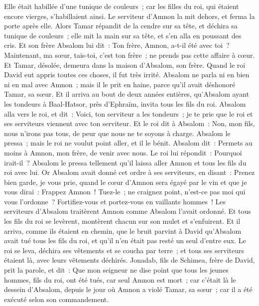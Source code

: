 \begin{multicols}{2}
Elle était habillée d'une tunique de couleurs~; car les filles du roi, qui étaient encore vierges, s'habillaient ainsi. Le serviteur d'Amnon la mit dehors, et ferma la porte après elle.
Alors Tamar répandit de la cendre sur sa tête, et déchira sa tunique de couleurs~; elle mit la main sur sa tête, et s'en alla en poussant des cris.
Et son frère Absalom lui dit~: Ton frère, Amnon, a-t-il été avec toi~? Maintenant, ma sœur, tais-toi, c'est ton frère~; ne prends pas cette affaire à cœur. Et Tamar, désolée, demeura dans la maison d'Absalom, son frère.
Quand le roi David eut appris toutes ces choses, il fut très irrité.
Absalom ne parla ni en bien ni en mal avec Amnon~; mais il le prit en haine, parce qu'il avait déshonoré Tamar, sa sœur.
Et il arriva au bout de deux années entières, qu'Absalom ayant les tondeurs à Baal-Hatsor, près d'Ephraïm, invita tous les fils du roi.
Absalom alla vers le roi, et dit~: Voici, ton serviteur a les tondeurs~; je te prie que le roi et ses serviteurs viennent avec ton serviteur.
Et le roi dit à Absalom~: Non, mon fils, nous n'irons pas tous, de peur que nous ne te soyons à charge. Absalom le pressa~; mais le roi ne voulut point aller, et il le bénit.
Absalom dit~: Permets au moins à Amnon, mon frère, de venir avec nous. Le roi lui répondit~: Pourquoi irait-il~?
Absalom le pressa tellement qu'il laissa aller Amnon et tous les fils du roi avec lui.
Or Absalom avait donné cet ordre à ses serviteurs, en disant~: Prenez bien garde, je vous prie, quand le cœur d'Amnon sera égayé par le vin et que je vous dirai~: Frappez Amnon~! Tuez-le~; ne craignez point, n'est-ce pas moi qui vous l'ordonne~? Fortifiez-vous et portez-vous en vaillants hommes~!
Les serviteurs d'Absalom traitèrent Amnon comme Absalom l'avait ordonné. Et tous les fils du roi se levèrent, montèrent chacun sur son mulet et s'enfuirent.
Et il arriva, comme ils étaient en chemin, que le bruit parvint à David qu'Absalom avait tué tous les fils du roi, et qu'il n'en était pas resté un seul d'entre eux.
Le roi se leva, déchira ses vêtements et se coucha par terre~; et tous ses serviteurs étaient là, avec leurs vêtements déchirés.
Jonadab, fils de Schimea, frère de David, prit la parole, et dit~: Que mon seigneur ne dise point que tous les jeunes hommes, fils du roi, ont été tués, car seul Amnon est mort~; car c'était là le dessein d'Absalom, depuis le jour où Amnon a violé Tamar, sa sœur~; car il a été exécuté selon son commandement.

\end{multicols}
